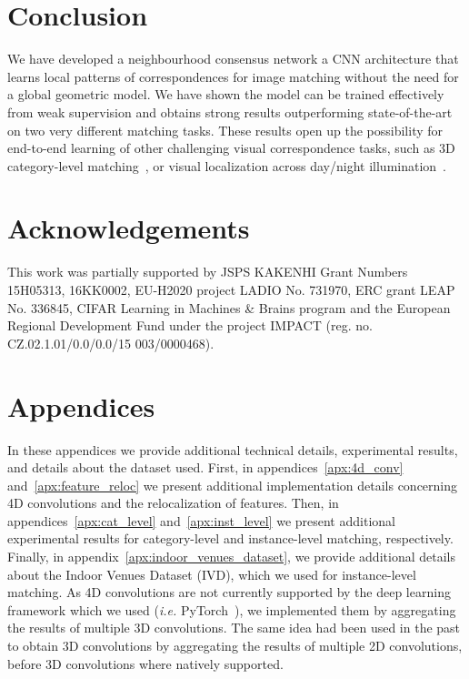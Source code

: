 \documentclass{article}
\begin{document}
\section{Conclusion}
We have developed a neighbourhood consensus network  a CNN architecture  that learns local patterns of correspondences for image matching without the need for a global geometric model. We have shown the model can be trained effectively from weak supervision and obtains strong results outperforming state-of-the-art on two very different matching tasks.  These results open up the possibility for end-to-end learning of other challenging visual correspondence tasks, such as 3D category-level matching~\cite{Kanazawa18}, or visual localization across day/night illumination~\cite{Sattler18}.

\section*{Acknowledgements}

This work was partially supported by
JSPS KAKENHI Grant Numbers 15H05313, 16KK0002, EU-H2020 project LADIO No. 731970, ERC
grant LEAP No. 336845, CIFAR Learning in Machines
\& Brains program and the European Regional
Development Fund under the project IMPACT (reg.
no. CZ.02.1.01/0.0/0.0/15 003/0000468).




\clearpage
\appendix
\section*{{\Large Appendices}}
In these appendices we provide additional technical details, experimental results, and details about the dataset used. First, in appendices~\ref{apx:4d_conv} and~\ref{apx:feature_reloc} we present additional implementation details concerning 4D convolutions and the relocalization of features. Then, in appendices~\ref{apx:cat_level} and~\ref{apx:inst_level} we present additional experimental results for category-level and instance-level matching, respectively. Finally, in appendix~\ref{apx:indoor_venues_dataset}, we provide additional details about the Indoor Venues Dataset (IVD), which we used for instance-level matching.
As 4D convolutions are not currently supported by the deep learning framework which we used (\emph{i.e.} PyTorch~\cite{pytorch}), we implemented them by aggregating the results of multiple 3D convolutions. The same idea had been used in the past to obtain 3D convolutions by aggregating the results of multiple 2D convolutions, before 3D convolutions where natively supported.
\end{document}
